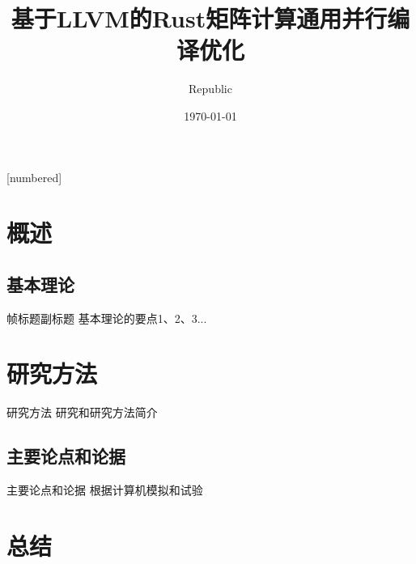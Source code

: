 \documentclass[14pt,hyperref={CJKbookmarks=true}]{beamer} %
\begin{document}
	\newtheorem{THeorem}{定理}  %
	\newtheorem{DEfinition}{定义} %
	\newtheorem{PRoof}{证明}  %
	\theoremstyle{example}
	\newtheorem{EXample}{示例}  %
	\kaishu
	[numbered]  %
	\title{基于LLVM的Rust矩阵计算通用并行编译优化}
	\author{Republic}
	\date{\today}
	\begin{frame}
		\titlepage
	\end{frame}
	\section{概述}
	\subsection{基本理论}
	\begin{frame}{帧标题}{副标题}
		基本理论的要点1、2、3...
	\end{frame}
	\section{研究方法}
	\begin{frame}{研究方法}
		研究和研究方法简介
	\end{frame}
	\subsection{主要论点和论据}
	\begin{frame}{主要论点和论据}
		根据计算机模拟和试验
	\end{frame}
	\section{总结}
\end{document}
